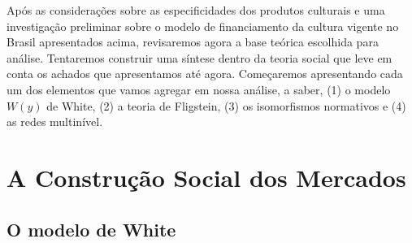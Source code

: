 \documentclass[a4paper, 12pt, openright, oneside, german, french, english, brazil]{abntex2}
\begin{document}
	Após as considerações sobre as especificidades dos produtos culturais e uma investigação preliminar sobre o modelo de financiamento da cultura vigente no Brasil apresentados acima, revisaremos agora a base teórica escolhida para análise. Tentaremos construir uma síntese dentro da teoria social que leve em conta os achados que apresentamos até agora. Começaremos apresentando cada um dos elementos que vamos agregar em nossa análise, a saber, (1) o modelo $W(y)$ de White, (2) a teoria de Fligstein, (3) os isomorfismos normativos e (4) as redes multinível.
	



	\chapter{A Construção Social dos Mercados}


	\section{O modelo de White}
\end{document}
